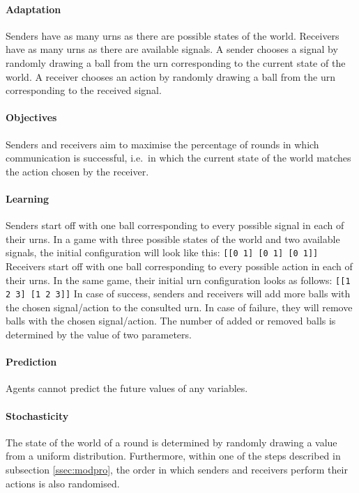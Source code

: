 \documentclass[DIV=calc,BCOR=0mm,pagesize]{scrartcl}
\newcommand{\code}[1]{\texttt{#1}}
\begin{document}
\paragraph{Adaptation}
Senders have as many urns as there are possible states of the world.
Receivers have as many urns as there are available signals.
A sender chooses a signal by randomly drawing a ball from the urn corresponding to the current state of the world.
A receiver chooses an action by randomly drawing a ball from the urn corresponding to the received signal.

\paragraph{Objectives}
Senders and receivers aim to maximise the percentage of rounds in which communication is successful, i.e.~in which the current state of the world matches the action chosen by the receiver.

\paragraph{Learning}
Senders start off with one ball corresponding to every possible signal in each of their urns.
In a game with three possible states of the world and two available signals, the initial configuration will look like this: \code{[[0 1] [0 1] [0 1]]}
Receivers start off with one ball corresponding to every possible action in each of their urns.
In the same game, their initial urn configuration looks as follows: \code{[[1 2 3] [1 2 3]]}
In case of success, senders and receivers will add more balls with the chosen signal/action to the consulted urn.
In case of failure, they will remove balls with the chosen signal/action.
The number of added or removed balls is determined by the value of two parameters.

\paragraph{Prediction}
Agents cannot predict the future values of any variables.

\paragraph{Stochasticity}
The state of the world of a round is determined by randomly drawing a value from a uniform distribution.
Furthermore, within one of the steps described in subsection \ref{ssec:modpro}, the order in which senders and receivers perform their actions is also randomised.
\end{document}
